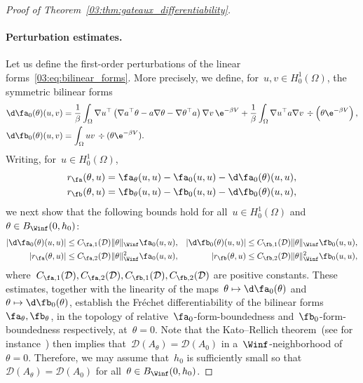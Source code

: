 \begin{proof}[Proof of Theorem~\ref{03:thm:gateaux_differentiability}]
    \paragraph{Perturbation estimates.}
    Let us define the first-order perturbations of the linear forms~\eqref{03:eq:bilinear_forms}. More precisely, we define, for~$u,v\in H_0^1(\Omega)$, the symmetric bilinear forms
    \begin{equation}
        \label{03:eq:perturbations}
        \begin{aligned}
        \d \fa_0(\theta)(u,v) &= \frac1\beta\int_\Omega \nabla u^\top \left(\nabla a^\top \theta -a\nabla \theta -\nabla\theta^\top a\right)\nabla v\,\e^{-\beta V}+ \frac1\beta \int_\Omega \nabla u^\top a \nabla v\,\div\left(\theta\e^{-\beta V}\right),\\
        \d \fb_0(\theta)(u,v) &= \int_\Omega uv\,\div(\theta \e^{-\beta V}).
        \end{aligned}
    \end{equation}
    Writing, for~$u\in H_0^1(\Omega)$,
    \begin{equation}
        \begin{aligned}
            \label{03:eq:remainders}
            r_{\fa}(\theta,u) &= \fa_\theta(u,u) - \fa_0(u,u)-\d \fa_0(\theta)(u,u),\\
            r_{\fb}(\theta,u) &= \fb_\theta(u,u) - \fb_0(u,u) - \d \fb_0(\theta)(u,u),
        \end{aligned}
    \end{equation}
    we next show that the following bounds hold for all~$u\in H_0^1(\Omega)$ and~$\theta\in B_{\Winf}(0,h_0)$:
    \begin{equation}
        \label{03:eq:perturbation_estimates}
        \begin{aligned}
        |\d \fa_0(\theta)(u,u)| &\leq C_{\fa,1}(\mathcal D) \|\theta\|_{\Winf}\fa_0(u,u), &|\d \fb_0(\theta)(u,u)| &\leq C_{\fb,1}(\mathcal D) \|\theta\|_{\Winf}\fb_0(u,u),\\
        |r_{\fa}(\theta,u)|&\leq C_{\fa,2}(\mathcal D)\|\theta\|^2_{\Winf}\fa_0(u,u), &|r_{\fb}(\theta,u)&\leq C_{\fb,2}(\mathcal D)\|\theta\|_{\Winf}^2 \fb_0(u,u),
        \end{aligned}
    \end{equation}
    where~$C_{\fa,1}(\mathcal D),C_{\fa,2}(\mathcal D),C_{\fb,1}(\mathcal D),C_{\fb,2}(\mathcal D)$ are positive constants.
    These estimates, together with the linearity of the maps~$\theta\mapsto \d \fa_0(\theta)$ and~$\theta\mapsto \d \fb_0(\theta)$, establish the Fréchet differentiability of the bilinear forms~$\fa_\theta,\fb_\theta$, in the topology of relative~$\fa_0$-form-boundedness and~$\fb_0$-form-boundedness respectively, at~$\theta=0$. Note that the Kato--Rellich theorem~(see for instance~\cite[Theorem 6.4]{T14}) then implies that~$\mathcal D(A_\theta) = \mathcal D(A_0)$ in a~$\Winf$-neighborhood of~$\theta=0$.
    Therefore, we may assume that~$h_0$ is sufficiently small so that~$\mathcal D(A_\theta)=\mathcal D(A_0)$ for all~$\theta\in B_{\Winf}(0,h_0)$.


\end{proof}
